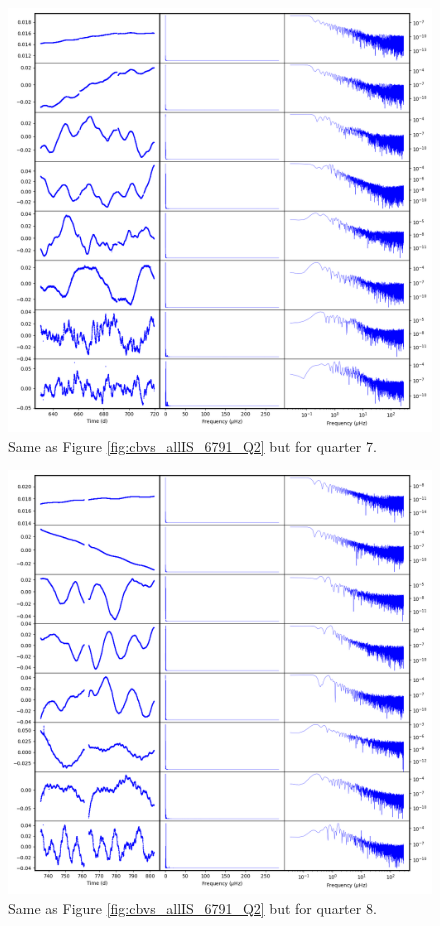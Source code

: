 \begin{figure}
    \centering
    \includegraphics[width=\linewidth]{Chapter_Appended/AppB/cbv_6791_q07.png}
    \caption{Same as Figure \ref{fig:cbvs_allIS_6791_Q2} but for quarter 7.}
    \label{fig:cbvs_allIS_6791_Q07}
\end{figure}


\begin{figure}
    \centering
    \includegraphics[width=\linewidth]{Chapter_Appended/AppB/cbv_6791_q08.png}
    \caption{Same as Figure \ref{fig:cbvs_allIS_6791_Q2} but for quarter 8.}
    \label{fig:cbvs_allIS_6791_Q08}
\end{figure}


